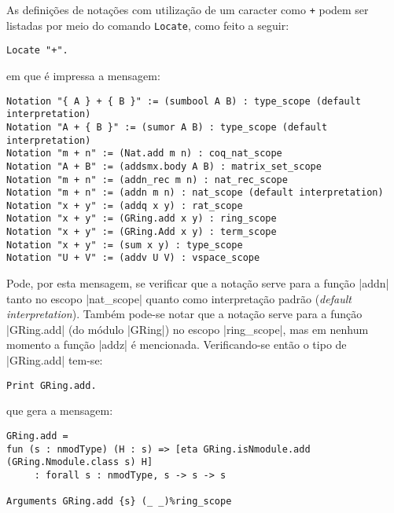 As definições de notações com utilização de um caracter como \lstinline[language = coq]!+! podem ser listadas por meio do comando \lstinline[language = coq]!Locate!, como feito a seguir:
    \begin{lstlisting}[language=coq,frame=single,tabsize=1]
Locate "+". 
    \end{lstlisting}
em que é impressa a mensagem:
    \begin{lstlisting}[language=coq-error,frame=single,tabsize=1]
Notation "{ A } + { B }" := (sumbool A B) : type_scope (default interpretation)
Notation "A + { B }" := (sumor A B) : type_scope (default interpretation)
Notation "m + n" := (Nat.add m n) : coq_nat_scope
Notation "A + B" := (addsmx.body A B) : matrix_set_scope
Notation "m + n" := (addn_rec m n) : nat_rec_scope
Notation "m + n" := (addn m n) : nat_scope (default interpretation)
Notation "x + y" := (addq x y) : rat_scope
Notation "x + y" := (GRing.add x y) : ring_scope
Notation "x + y" := (GRing.Add x y) : term_scope
Notation "x + y" := (sum x y) : type_scope
Notation "U + V" := (addv U V) : vspace_scope
    \end{lstlisting}
Pode, por esta mensagem, se verificar que a notação serve para a função \coqinline|addn| tanto no escopo \coqinline|nat_scope| quanto como interpretação padrão (\textit{default interpretation}). Também pode-se notar que a notação serve para a função \coqinline|GRing.add| (do módulo \coqinline|GRing|) no escopo \coqinline|ring_scope|, mas em nenhum momento a função \coqinline|addz| é mencionada. Verificando-se então o tipo de \coqinline|GRing.add| tem-se:
    \begin{lstlisting}[language=coq,frame=single,tabsize=1]
Print GRing.add.
    \end{lstlisting}
que gera a mensagem:
    \begin{lstlisting}[language=coq-error,frame=single,tabsize=1]
GRing.add =
fun (s : nmodType) (H : s) => [eta GRing.isNmodule.add (GRing.Nmodule.class s) H]
     : forall s : nmodType, s -> s -> s

Arguments GRing.add {s} (_ _)%ring_scope
    \end{lstlisting}
